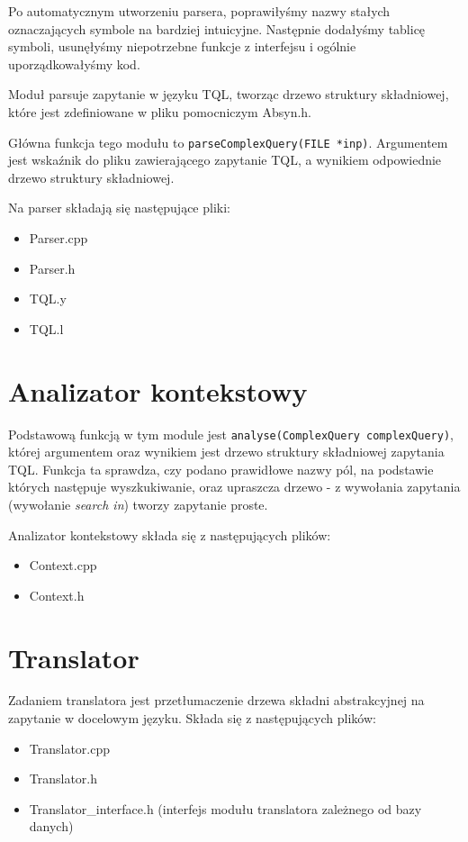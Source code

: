 Po automatycznym utworzeniu parsera, 
poprawiłyśmy nazwy stałych oznaczających symbole na bardziej intuicyjne.
Następnie
dodałyśmy tablicę symboli,
usunęłyśmy niepotrzebne funkcje z interfejsu
i ogólnie uporządkowałyśmy kod.

Moduł  parsuje zapytanie w języku TQL, tworząc drzewo struktury składniowej, które jest zdefiniowane w pliku pomocniczym Absyn.h.

Główna funkcja tego modułu to \verb|parseComplexQuery(FILE *inp)|. Argumentem jest wskaźnik do pliku zawierającego zapytanie TQL, 
a wynikiem odpowiednie drzewo struktury składniowej.

Na parser składają się następujące pliki:
\begin{itemize}
 \item Parser.cpp
 \item Parser.h
 \item TQL.y %
 \item TQL.l %
\end{itemize}


\section{Analizator kontekstowy}
Podstawową funkcją w tym module jest \verb|analyse(ComplexQuery complexQuery)|, której argumentem oraz wynikiem jest 
drzewo struktury składniowej zapytania TQL. Funkcja ta
 sprawdza, czy podano prawidłowe nazwy pól, na podstawie których następuje wyszkukiwanie,  %
oraz upraszcza drzewo - z wywołania zapytania (wywołanie \textit{search in}) tworzy zapytanie proste.

Analizator kontekstowy składa się z następujących plików:
\begin{itemize}
 \item Context.cpp
 \item Context.h
\end{itemize}

\section{Translator}
Zadaniem translatora jest przetłumaczenie drzewa składni abstrakcyjnej na zapytanie w docelowym języku.
Składa się z następujących plików:
\begin {itemize}
 \item Translator.cpp
 \item Translator.h
 \item Translator\_interface.h (interfejs modułu translatora zależnego od bazy danych)
\end {itemize}


